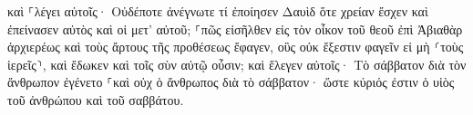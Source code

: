 \documentclass{openreader}
\begin{document}
καὶ ⸀λέγει αὐτοῖς· Οὐδέποτε ἀνέγνωτε τί ἐποίησεν Δαυὶδ ὅτε χρείαν ἔσχεν καὶ ἐπείνασεν αὐτὸς καὶ οἱ μετ’ αὐτοῦ; 
⸀πῶς εἰσῆλθεν εἰς τὸν οἶκον τοῦ θεοῦ ἐπὶ Ἀβιαθὰρ ἀρχιερέως καὶ τοὺς ἄρτους τῆς προθέσεως ἔφαγεν, οὓς οὐκ ἔξεστιν φαγεῖν εἰ μὴ ⸂τοὺς ἱερεῖς⸃, καὶ ἔδωκεν καὶ τοῖς σὺν αὐτῷ οὖσιν; 
καὶ ἔλεγεν αὐτοῖς· Τὸ σάββατον διὰ τὸν ἄνθρωπον ἐγένετο ⸀καὶ οὐχ ὁ ἄνθρωπος διὰ τὸ σάββατον· 
ὥστε κύριός ἐστιν ὁ υἱὸς τοῦ ἀνθρώπου καὶ τοῦ σαββάτου. 
\end{document}

